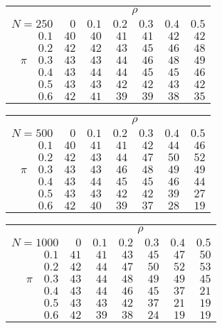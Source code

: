 \begin{tabular}{r|rrrrrr}
\hline\hline
 &\multicolumn{6}{c}{$\rho$} \\ 
 $N = 250$ & $0$ & $0.1$ & $0.2$ & $0.3$ & $0.4$ & $0.5$ \\ 
 \hline$0.1$ & $40$ & $40$ & $41$ & $41$ & $42$ & $42$\\ 
$0.2$ & $42$ & $42$ & $43$ & $45$ & $46$ & $48$\\ 
$\pi\quad$$0.3$ & $43$ & $43$ & $44$ & $46$ & $48$ & $49$\\ 
$0.4$ & $43$ & $44$ & $44$ & $45$ & $45$ & $46$\\ 
$0.5$ & $43$ & $43$ & $42$ & $42$ & $43$ & $42$\\ 
$0.6$ & $42$ & $41$ & $39$ & $39$ & $38$ & $35$\\ 
 \hline 
 \end{tabular}
 
 \vspace{2em} 
 
\begin{tabular}{r|rrrrrr}
\hline\hline
 &\multicolumn{6}{c}{$\rho$} \\ 
 $N = 500$ & $0$ & $0.1$ & $0.2$ & $0.3$ & $0.4$ & $0.5$ \\ 
 \hline$0.1$ & $40$ & $41$ & $41$ & $42$ & $44$ & $46$\\ 
$0.2$ & $42$ & $43$ & $44$ & $47$ & $50$ & $52$\\ 
$\pi\quad$$0.3$ & $43$ & $43$ & $46$ & $48$ & $49$ & $49$\\ 
$0.4$ & $43$ & $44$ & $45$ & $45$ & $46$ & $44$\\ 
$0.5$ & $43$ & $43$ & $42$ & $42$ & $39$ & $27$\\ 
$0.6$ & $42$ & $40$ & $39$ & $37$ & $28$ & $19$\\ 
 \hline 
 \end{tabular}
 
 \vspace{2em} 
 
\begin{tabular}{r|rrrrrr}
\hline\hline
 &\multicolumn{6}{c}{$\rho$} \\ 
 $N = 1000$ & $0$ & $0.1$ & $0.2$ & $0.3$ & $0.4$ & $0.5$ \\ 
 \hline$0.1$ & $41$ & $41$ & $43$ & $45$ & $47$ & $50$\\ 
$0.2$ & $42$ & $44$ & $47$ & $50$ & $52$ & $53$\\ 
$\pi\quad$$0.3$ & $43$ & $44$ & $48$ & $49$ & $49$ & $45$\\ 
$0.4$ & $43$ & $44$ & $46$ & $45$ & $37$ & $21$\\ 
$0.5$ & $43$ & $43$ & $42$ & $37$ & $21$ & $19$\\ 
$0.6$ & $42$ & $39$ & $38$ & $24$ & $19$ & $19$\\ 
 \hline 
 \end{tabular}